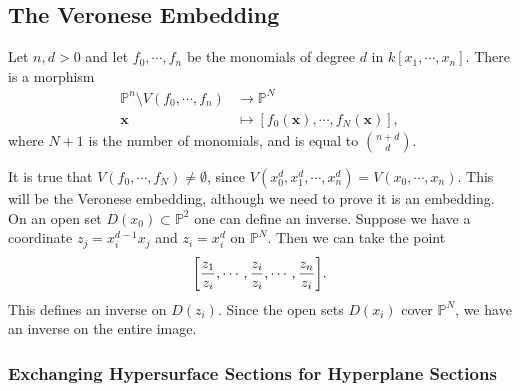 \hypertarget{the-veronese-embedding}{%
\subsection{The Veronese Embedding}\label{the-veronese-embedding}}

\begin{definition}

Let \(n, d > 0\) and let \(f_0, \cdots, f_n\) be the monomials of degree
\(d\) in \(k[x_1, \cdots, x_{n}]\). There is a morphism
\begin{align*}  
{\mathbb{P}}^n \setminus V(f_0,\cdots , f_n) &\to {\mathbb{P}}^N \\
\mathbf{x} &\mapsto [f_0(\mathbf{x}), \cdots, f_N(\mathbf{x})]
,\end{align*}
where \(N+1\) is the number of monomials, and is equal to
\({n+d \choose d}\).

\end{definition}

\begin{remark}

It is true that \(V(f_0, \cdots, f_N) \neq \emptyset\), since
\(V(x_0^d, x_1^d, \cdots, x_n^d) = V(x_0, \cdots, x_n)\). This will be
the Veronese embedding, although we need to prove it is an embedding. On
an open set \(D(x_0) \subset {\mathbb{P}}^2\) one can define an inverse.
Suppose we have a coordinate \(z_j = x_i^{d-1} x_j\) and \(z_i = x_i^d\)
on \({\mathbb{P}}^N\). Then we can take the point
\begin{align*}  
{\left[ { {z_1 \over z_i}, \cdots, {z_i \over z_i}, \cdots, {z_n \over z_i} } \right]}
.\end{align*}
This defines an inverse on \(D(z_i)\). Since the open sets \(D(x_i)\)
cover \({\mathbb{P}}^N\), we have an inverse on the entire image.

\end{remark}

\hypertarget{exchanging-hypersurface-sections-for-hyperplane-sections}{%
\subsubsection{Exchanging Hypersurface Sections for Hyperplane
Sections}\label{exchanging-hypersurface-sections-for-hyperplane-sections}}

